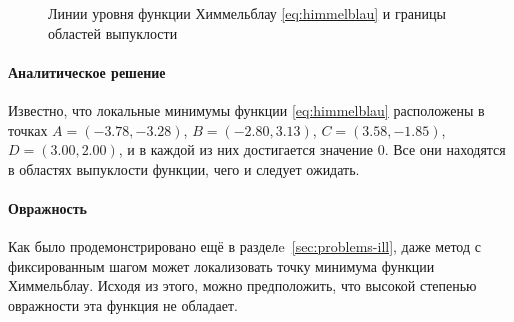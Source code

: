 \begin{figure}[thb]
  \centering
  \caption[Функция Химмельблау]{Линии уровня функции Химмельблау
    \eqref{eq:himmelblau} и границы областей выпуклости}
  \label{fig:himmelblau-conv}
\end{figure}

\paragraph{Аналитическое решение}
Известно, что локальные минимумы функции \eqref{eq:himmelblau}
расположены в точках $A=(-3.78, -3.28)$, $B=(-2.80, 3.13)$, $C=(3.58,
-1.85)$, $D=(3.00, 2.00)$, и в каждой из них достигается значение $0$.
Все они находятся в областях выпуклости функции, чего и следует
ожидать.

\paragraph{Овражность}
Как было продемонстрировано ещё в разделe \ref{sec:problems-ill}, даже
метод \gd{} с фиксированным шагом может локализовать точку минимума
функции Химмельблау. Исходя из этого, можно предположить, что высокой
степенью овражности эта функция не обладает.

